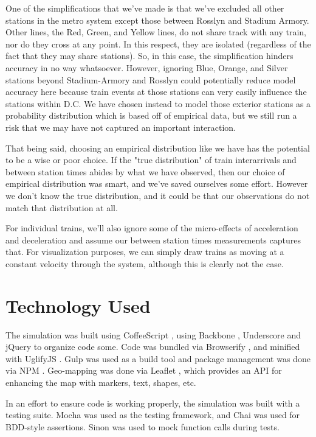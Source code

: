 \documentclass[a4paper,12pt]{article}
\begin{document}
One of the simplifications that we've made is that we've excluded all other stations in the metro system except those
between Rosslyn and Stadium Armory. Other lines, the Red, Green, and Yellow lines, do not share track with any train,
nor do they cross at any point. In this respect, they are isolated (regardless of the fact that they may share
stations). So, in this case, the simplification hinders accuracy in no way whatsoever. However, ignoring Blue, Orange,
and Silver stations beyond Stadium-Armory and Rosslyn could potentially
reduce model accuracy here because train events at those stations can very easily influence the stations within D.C.
We have chosen instead to model those exterior stations as a probability distribution which is based off of empirical
data, but we still run a risk that we may have not captured an important interaction.

That being said, choosing an empirical distribution like we have has the potential to be a wise or poor choice. If the
"true distribution" of train interarrivals and between station times abides by what we have observed, then our choice
of empirical distribution was smart, and we've saved ourselves some effort. However we don't know the true
distribution, and it could be that our observations do not match that distribution at all.

For individual trains, we'll also ignore some of the micro-effects of acceleration and deceleration and assume our
between station times measurements captures that. For visualization purposes, we can simply draw trains as moving at a
constant velocity through the system, although this is clearly not the case.

\section{Technology Used}
The simulation was built using CoffeeScript \cite{coffeescript}, using Backbone \cite{backbone}, Underscore
\cite{underscore} and jQuery \cite{jQuery} to organize code some. Code was bundled via Browserify \cite{browserify},
and minified with UglifyJS \cite{uglify}. Gulp \cite{gulp} was used as a build tool and package management was done
via NPM \cite{npm}. Geo-mapping was done via Leaflet \cite{leaflet}, which provides an API for enhancing the map with
markers, text, shapes, etc.

In an effort to ensure code is working properly, the simulation was built with a testing suite. Mocha \cite{mocha} was
used as the testing framework, and Chai \cite{chai} was used for BDD-style assertions. Sinon \cite{sinon} was used to
mock function calls during tests.
\end{document}
